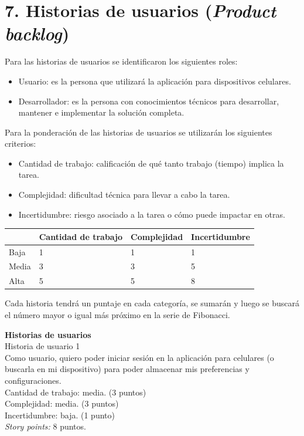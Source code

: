 \documentclass[
11pt, %
]{charter}
\begin{document}
\section{7. Historias de usuarios (\textit{Product backlog})}
\label{sec:backlog}

Para las historias de usuarios se identificaron los siguientes roles:
\begin{itemize}
\item Usuario: es la persona que utilizará la aplicación para dispositivos celulares.
\item Desarrollador: es la persona con conocimientos técnicos para desarrollar, mantener e implementar la solución completa. 
\end{itemize}


Para la ponderación de las historias de usuarios se utilizarán los siguientes criterios:

\begin{itemize}
\item Cantidad de trabajo: calificación de qué tanto trabajo (tiempo) implica la tarea.
\item Complejidad: dificultad técnica para llevar a cabo la tarea.
\item Incertidumbre: riesgo asociado a la tarea o cómo puede impactar en otras. 
\end{itemize}

\begin{table}[H]
\begin{tabularx}{\linewidth}{@{}|l|X|X|l|@{}}
\hline
\rowcolor[HTML]{C0C0C0} 
	           & Cantidad de trabajo & Complejidad 	& Incertidumbre  \\ \hline
Baja       & 1     & 1	& 1      	\\ \hline
Media   & 3     & 3     	& 5 	\\ \hline
Alta    & 5      & 5 	& 8\\ \hline
\end{tabularx}
\end{table}


Cada historia tendrá un puntaje en cada categoría, se sumarán  y luego se buscará el número mayor o igual más próximo en la serie de Fibonacci.

\textbf{Historias de usuarios}\\
Historia de usuario 1 \\
Como usuario, quiero poder iniciar sesión en la aplicación para celulares (o buscarla en mi dispositivo) para poder almacenar mis preferencias y configuraciones.\\
Cantidad de trabajo: media. (3 puntos)\\
Complejidad: media. (3 puntos)\\
Incertidumbre: baja. (1 punto)\\
\textit{Story points:} 8 puntos.
\end{document}
